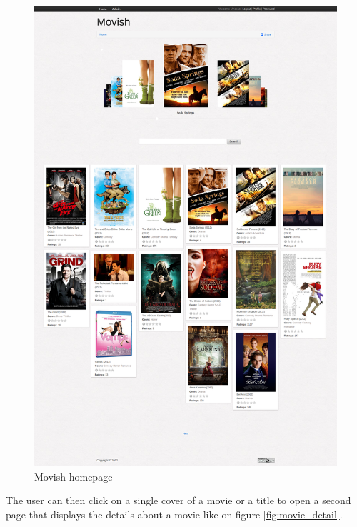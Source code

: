 \begin{figure}
  \centering
  \includegraphics[width=\textwidth]{figures/movish-homepage.png}
  \caption{Movish homepage}
  \label{fig:movish_homepage}
\end{figure}

The user can then click on a single cover of a movie or a title to open a second page that displays the details about a movie like on figure \ref{fig:movie_detail}.

